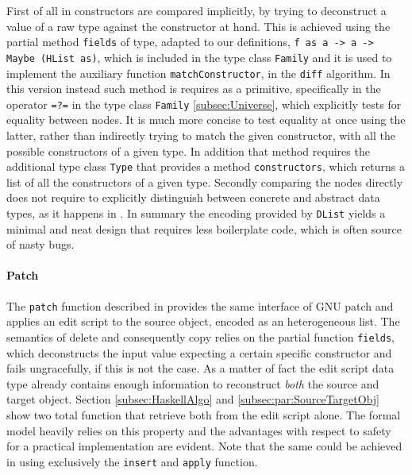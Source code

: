 \documentclass[../Thesis.tex]{subfiles}
\begin{document}
	First of all in \cite{Lemp09} constructors are compared implicitly,
	by trying to deconstruct a value of a raw type against the constructor
	at hand. This is achieved using the partial method \texttt{fields} of type,
	adapted to our definitions, \texttt{f as a -> a -> Maybe (HList as)},
	which is included in the type class \texttt{Family} and it is used to
	implement the auxiliary function \texttt{matchConstructor}, in the
	\texttt{diff} algorithm.
	In this version instead such method is requires as a primitive,
	specifically in the operator \texttt{=?=} in the type class \texttt{Family} 
	\ref{subsec:Universe}, which explicitly tests for equality 
	between nodes.
	It is much more concise to test equality at once using the latter,
	rather than indirectly trying to match the given constructor,
	with all the possible constructors of a given type.
	In addition that method requires the additional type class \texttt{Type} that 
	provides a method \texttt{constructors}, which 
	returns a list of all the constructors of a given type.
	Secondly comparing the nodes directly does not require to 
	explicitly distinguish between concrete and abstract data types, as 
	it happens in \cite{Lemp09}.
	In summary the encoding provided by \texttt{DList} yields a
	minimal and neat design that requires less boilerplate code,
	which is often source of nasty bugs.
	
	\paragraph{Patch}
	The \texttt{patch} function described in \cite{Lemp09} provides the 
	same interface of GNU patch and applies an edit script 
	to the source object, encoded as an heterogeneous list.
	The semantics of delete and consequently copy relies
	on the partial function \texttt{fields}, which deconstructs the input
	value expecting a certain specific constructor and fails ungracefully,
	if this is not the case.
	As a matter of fact the edit script data type already contains enough 
	information to reconstruct \emph{both} the source and target object.
	Section \ref{subsec:HaskellAlgo} and \ref{subsec:par:SourceTargetObj} show
	two total function that retrieve both from the edit script alone.
	The formal model heavily relies on this property and the advantages with respect to safety for a 
	practical implementation	are evident.
	Note that 	the same could be achieved in \cite{Lemp09} using
	exclusively the \texttt{insert} and \texttt{apply} function.
\end{document}
